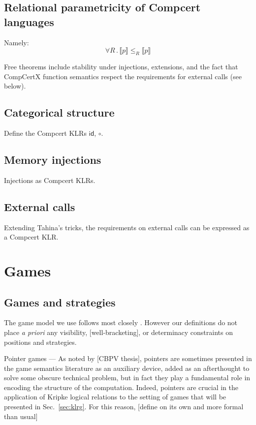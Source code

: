 \documentclass[acmsmall,anonymous]{acmart}
\newcommand{\kw}[1]{\ensuremath{ \textsf{#1} }}
\begin{document}

\subsection{Relational parametricity of Compcert languages} %

Namely:
\[ \forall R \,.\, \llbracket p \rrbracket \le_R \llbracket p \rrbracket \]

Free theorems include
stability under injections, extensions,
and the fact that CompCertX function semantics
respect the requirements for external calls (see below).


\subsection{Categorical structure} %

Define the Compcert KLRs \kw{id}, $\circ$.


\subsection{Memory injections} %

Injections as Compcert KLRs.


\subsection{External calls} %

Extending Tahina's tricks,
the requirements on
external calls
can be expressed as a Compcert KLR.



\newpage
\section{Games} %

\subsection{Games and strategies} %

The game model we use follows most closely \citep{gamesem99}.
However our definitions
do not place \emph{a priori}
any visibility, [well-bracketing], or determinacy
constraints on positions and strategies.

Pointer games ---
As noted by [CBPV thesis],
pointers are sometimes presented in the game semantics literature
as an auxiliary device,
added as an afterthought to solve some obscure technical problem,
but in fact they play a fundamental role
in encoding the structure of the computation.
Indeed,
pointers are crucial in the
application of Kripke logical relations
to the setting of games
that will be presented in Sec.~\ref{sec:klrg}.
For this reason,
[define on its own and more formal than usual]
\end{document}
